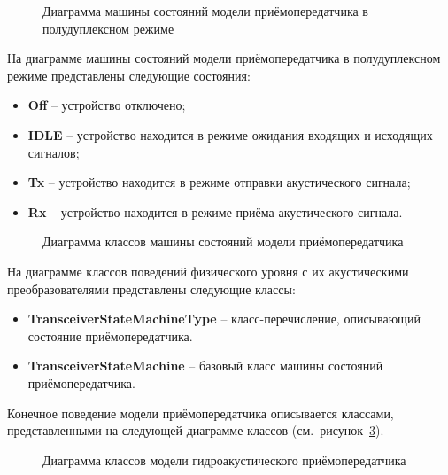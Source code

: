 \documentclass[
    numbers=section,
    document-code={ВКРБ--09.03.04--10.19--XX--26--81}
]{../latex/fqw}
\begin{document}
    \begin{figure}[H]
        \centering
        \fbox{\rule{0pt}{20mm}\rule{40mm}{0pt}}
        \caption{Диаграмма машины состояний модели приёмопередатчика в полудуплексном режиме}
        \label{fig:state_machine_diagram_of_the_transceiver_model}
    \end{figure}

    На диаграмме машины состояний модели приёмопередатчика в полудуплексном режиме представлены следующие состояния:

    \begin{itemize}
        \item \textbf{Off} -- устройство отключено;
        \item \textbf{IDLE} -- устройство находится в режиме ожидания входящих и исходящих сигналов;
        \item \textbf{Tx} -- устройство находится в режиме отправки акустического сигнала;
        \item \textbf{Rx} -- устройство находится в режиме приёма акустического сигнала.
    \end{itemize}

    \begin{figure}[H]
        \centering
        \fbox{\rule{0pt}{20mm}\rule{40mm}{0pt}}
        \caption{Диаграмма классов машины состояний модели приёмопередатчика}
        \label{fig:class_diagram_of_the_transceiver_models_state_machine}
    \end{figure}

    На диаграмме классов поведений физического уровня
    с их акустическими преобразователями представлены следующие классы:

    \begin{itemize}
        \item \textbf{TransceiverStateMachineType} -- класс-перечисление, описывающий состояние приёмопередатчика.
        \item \textbf{TransceiverStateMachine} -- базовый класс машины состояний приёмопередатчика.
    \end{itemize}

    Конечное поведение модели приёмопередатчика описывается классами, представленными на следующей диаграмме классов
    (см.~рисунок~\ref{fig:class_diagram_of_hydroacoustic_transceiver_model}).

    \begin{figure}[H]
        \centering
        \fbox{\rule{0pt}{20mm}\rule{40mm}{0pt}}
        \caption{Диаграмма классов модели гидроакустического приёмопередатчика}
        \label{fig:class_diagram_of_hydroacoustic_transceiver_model}
    \end{figure}
\end{document}
